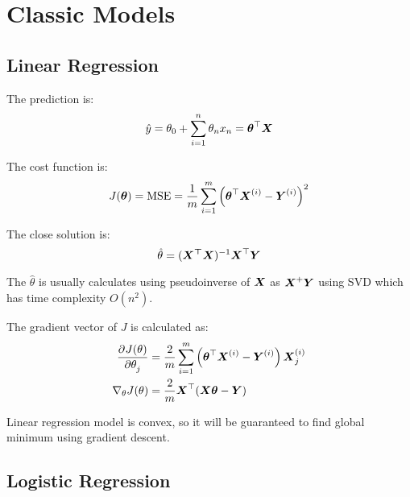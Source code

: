 \section{Classic Models}



\subsection{Linear Regression}

The prediction is:
\begin{equation}
    \hat{y} = \theta_0 + \sum_{i=1}^n \theta_n x_n = \boldsymbol{\theta}^\top \boldsymbol{X}
\end{equation}

The cost function is:
\begin{equation}
    J(\boldsymbol{\theta} ) = \text{MSE} = \frac{1}{m} \sum_{i=1}^m \left(\boldsymbol{\theta}^\top  \boldsymbol{X}^{(i)} - \boldsymbol{Y}^{(i)} \right)^2
\end{equation}

The close solution is:
\begin{equation}
    \hat{\theta} = (\boldsymbol{{X}^\top \boldsymbol{X}} )^{-1} \boldsymbol{X}^\top \boldsymbol{Y}
\end{equation}

The $\hat{\theta}$ is usually calculates using pseudoinverse of $\boldsymbol{X}$ as $\boldsymbol{{X}}^{+} \boldsymbol{Y}$ using SVD which has time complexity $O(n^2)$. 


The gradient vector of $J$ is calculated as:
\begin{equation}
    \begin{aligned}
    \dpd{J(\theta)}{\theta_j} &= \frac{2}{m} \sum_{i=1}^m \left( \columnvector{\theta}^\top \subscription{X}{i} - \subscription{Y}{i} \right) \subscription{X}{i}_j \\
    \nabla_\theta J(\theta) &= \frac{2}{m} \columnvector{X}^\top (\columnvector{X} \columnvector{\theta} - \columnvector{Y} )
    \end{aligned}
\end{equation}



Linear regression model is convex, so it will be guaranteed to find global minimum using gradient descent.




\subsection{Logistic Regression}


